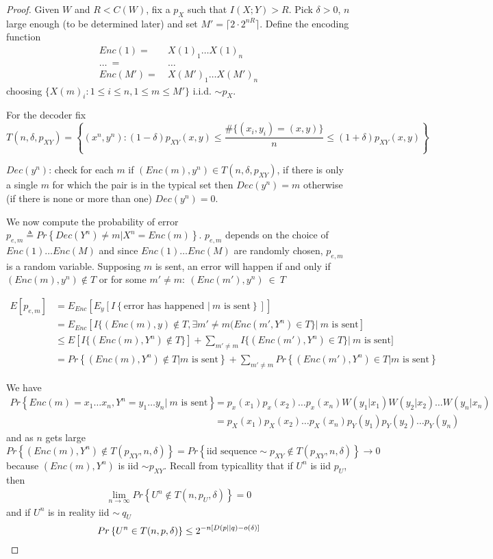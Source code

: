 \documentclass[twoside]{article}
\theoremstyle{definition} %
\renewcommand{\Pr}[1]{Pr\left\{#1\right\}}
\newcommand{\Ex}[1]{E\left[#1\right]}
\begin{document}
\begin{proof}
  Given $W$ and $R<C(W)$, fix a $p_X$ such that $I(X;Y)>R$. Pick $\delta > 0$, $n$
  large enough (to be determined later) and set $M' = \lceil 2 \cdot 2^{nR} \rceil$. Define the
  encoding function
  \begin{align*}
    Enc(1) =~&X(1)_1 \dots  X(1)_n\\
    \dots~=~&\dots\\
    Enc(M') =~&X(M')_1 \dots X(M')_n
  \end{align*}
  choosing $\{X(m)_i : 1 \leq i \leq n, 1 \leq m \leq M' \}$ i.i.d. $\sim p_X$.

  For the decoder fix
  \[
    T(n, \delta, p_{XY})= \left\{(x^n, y^n): (1-\delta)p_{XY}(x,y) \leq \frac {\# \{(x_i, y_i) = (x,y)\}} n \leq (1+\delta)p_{XY}(x,y)\right\}
  \]

  $Dec(y^n)$: check for each $m$ if $(Enc(m), y^n) \in T(n,\delta, p_{XY})$, if there is
  only a single $m$ for which the pair is in the typical set then $Dec(y^n) = m$ otherwise
  (if there is none or more than one) $Dec(y^n) = 0$.

  We now compute the probability of error $p_{e,m} \triangleq \Pr{Dec(Y^n) \not = m | X^n = Enc(m)}$. $p_{e,m}$ depends on the choice of $Enc(1) \dots Enc(M)$ and since $Enc(1) \dots Enc(M)$ are randomly chosen, $p_{e,m}$ is a random variable. Supposing $m$ is sent, an error will happen if and only if $(Enc(m), y^n) \not \in T$ or for some $m' \not = m:~(Enc(m'), y^n)~\in~T$

  \begin{align*}
    \Ex{p_{e,m}} &= E_{Enc}[ E_{y} [ I\left\{\text{error has happened $|~m$ is sent}\right\}]]\\
    &= E_{Enc}[ I\{(Enc(m),y) \not \in T, \exists m' \not=m (Enc(m', Y^n) \in T\} |~m \text{ is sent}]\\
    &\leq E[I\{(Enc(m), Y^n) \not \in T\}] + \sum_{m' \not = m} I\{(Enc(m'), Y^n) \in T\} |~m \text{ is sent}]\\
    &= \Pr{(Enc(m), Y^n) \not \in T | m \text{ is sent}} + \sum_{m'\not = m} \Pr{(Enc(m'), Y^n) \in T| m \text{ is sent}}
  \end{align*}

  We have
  \begin{align*}
    \Pr{Enc(m) = x_1\dots x_n, Y^n=y_1 \dots y_n |~m \text{ is sent}}
    &= p_x(x_1)p_x(x_2)\dots p_x(x_n)W(y_1|x_1)W(y_2|x_2) \dots W(y_n|x_n) \\
    &= p_X(x_1)p_X(x_2)\dots p_X(x_n)p_Y(y_1)p_Y(y_2)\dots p_Y(y_n)
  \end{align*}
  and as $n$ gets large
  \[
    \Pr{(Enc(m), Y^n) \not \in T (p_{XY}, n, \delta)} = \Pr{\text{iid sequence} \sim p_{XY} \not \in T(p_{XY}, n, \delta)} \to 0
  \]
because $(Enc(m), Y^n)$ is iid $\sim p_{XY}$. Recall from typicallity that if $U^n$ is iid $p_U$, then
\begin{align*}
  \lim_{n\to\infty} \Pr{U^n \not \in T(n, p_U, \delta)} = 0
\end{align*}
and if $U^n$ is in reality iid $\sim~q_U$
\[
  \Pr{U^n \in T(n,p,\delta)} \leq 2^{-n[D(p||q) - o(\delta)]}\\
\]


\end{proof}
\end{document}
